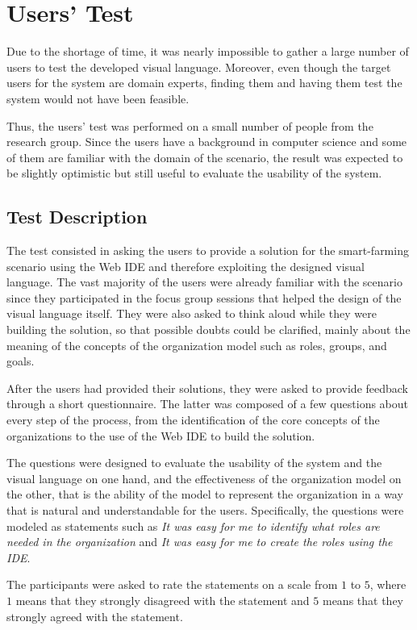 \section{Users' Test}
Due to the shortage of time, it was nearly impossible to gather a large number of users to test the developed visual language.
Moreover, even though the target users for the system are domain experts, finding them and having them test the system would not have been feasible.

Thus, the users' test was performed on a small number of people from the research group.
Since the users have a background in computer science and some of them are familiar with the domain of the scenario, the result was expected to be slightly optimistic but still useful to evaluate the usability of the system.

\subsection{Test Description}
The test consisted in asking the users to provide a solution for the smart-farming scenario using the Web IDE and therefore exploiting the designed visual language.
The vast majority of the users were already familiar with the scenario since they participated in the focus group sessions that helped the design of the visual language itself.
They were also asked to think aloud while they were building the solution, so that possible doubts could be clarified, mainly about the meaning of the concepts of the organization model such as roles, groups, and goals.

After the users had provided their solutions, they were asked to provide feedback through a short questionnaire.
The latter was composed of a few questions about every step of the process, from the identification of the core concepts of the organizations to the use of the Web IDE to build the solution.

The questions were designed to evaluate the usability of the system and the visual language on one hand, and the effectiveness of the organization model on the other, that is the ability of the model to represent the organization in a way that is natural and understandable for the users.
Specifically, the questions were modeled as statements such as \textit{It was easy for me to identify what roles are needed in the organization} and \textit{It was easy for me to create the roles using the IDE}.

The participants were asked to rate the statements on a scale from $1$ to $5$, where $1$ means that they strongly disagreed with the statement and $5$ means that they strongly agreed with the statement.

